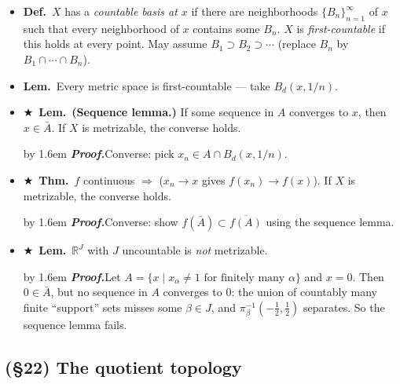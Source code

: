 \documentclass[12pt,a4paper]{article}
\newcommand{\Dfn}{\textbf{Def.}~}
\newcommand{\Thm}{\textbf{Thm.}~}
\newcommand{\Lem}{\textbf{Lem.}~}
\newcommand{\Key}{$\bigstar$~}                  %
\newcommand{\Pf}[1]{%
  \par\addvspace{7pt}\nopagebreak
  \begingroup
    \advance\leftskip by 1.6em
    \parindent=0pt \small\color{prf}%
    \textbf{\textit{Proof.}}\enspace #1\par
  \endgroup
  \addvspace{9pt}}
\newenvironment{BL}%
  {\begin{itemize}[leftmargin=1.4em,labelsep=0.55em,itemsep=11pt,topsep=11pt,parsep=0pt]}%
  {\end{itemize}}
\newcommand{\RR}{\mathbb{R}}
\newcommand{\imp}{\Rightarrow}
\begin{document}
\begin{BL}
\item \Dfn $X$ has a \emph{countable basis at $x$} if there are neighborhoods
      $\{B_n\}_{n=1}^{\infty}$ of $x$ such that every neighborhood of $x$ contains some $B_n$.
      $X$ is \emph{first-countable} if this holds at every point.
      May assume $B_1\supset B_2\supset\cdots$ (replace $B_n$ by $B_1\cap\cdots\cap B_n$).
\item \Lem Every metric space is first-countable \;--- take $B_d(x,1/n)$.
\item \Key\Lem \textbf{(Sequence lemma.)} If some sequence in $A$ converges to $x$, then
      $x\in\bar A$. If $X$ is metrizable, the converse holds.
\Pf{Converse: pick $x_n\in A\cap B_d(x,1/n)$.}
\item \Key\Thm $f$ continuous $\imp$ ($x_n\to x$ gives $f(x_n)\to f(x)$).
      If $X$ is metrizable, the converse holds.
\Pf{Converse: show $f(\bar A)\subset\overline{f(A)}$ using the sequence lemma.}
\item \Key\Lem $\RR^J$ with $J$ uncountable is \emph{not} metrizable.
\Pf{Let $A=\{x\mid x_\alpha\neq1\text{ for finitely many }\alpha\}$ and $x=0$.
Then $0\in\bar A$, but no sequence in $A$ converges to $0$: the union of countably many finite
``support'' sets misses some $\beta\in J$, and $\pi_\beta^{-1}(-\tfrac12,\tfrac12)$ separates.
So the sequence lemma fails.}
\end{BL}

\subsection{(\S22) The quotient topology}
\end{document}
